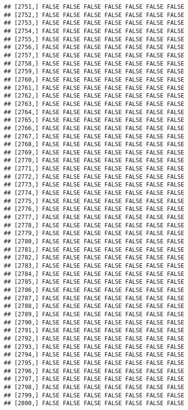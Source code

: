 \documentclass[
]{article}
\begin{document}
\begin{verbatim}
## [2751,] FALSE FALSE FALSE FALSE FALSE FALSE FALSE
## [2752,] FALSE FALSE FALSE FALSE FALSE FALSE FALSE
## [2753,] FALSE FALSE FALSE FALSE FALSE FALSE FALSE
## [2754,] FALSE FALSE FALSE FALSE FALSE FALSE FALSE
## [2755,] FALSE FALSE FALSE FALSE FALSE FALSE FALSE
## [2756,] FALSE FALSE FALSE FALSE FALSE FALSE FALSE
## [2757,] FALSE FALSE FALSE FALSE FALSE FALSE FALSE
## [2758,] FALSE FALSE FALSE FALSE FALSE FALSE FALSE
## [2759,] FALSE FALSE FALSE FALSE FALSE FALSE FALSE
## [2760,] FALSE FALSE FALSE FALSE FALSE FALSE FALSE
## [2761,] FALSE FALSE FALSE FALSE FALSE FALSE FALSE
## [2762,] FALSE FALSE FALSE FALSE FALSE FALSE FALSE
## [2763,] FALSE FALSE FALSE FALSE FALSE FALSE FALSE
## [2764,] FALSE FALSE FALSE FALSE FALSE FALSE FALSE
## [2765,] FALSE FALSE FALSE FALSE FALSE FALSE FALSE
## [2766,] FALSE FALSE FALSE FALSE FALSE FALSE FALSE
## [2767,] FALSE FALSE FALSE FALSE FALSE FALSE FALSE
## [2768,] FALSE FALSE FALSE FALSE FALSE FALSE FALSE
## [2769,] FALSE FALSE FALSE FALSE FALSE FALSE FALSE
## [2770,] FALSE FALSE FALSE FALSE FALSE FALSE FALSE
## [2771,] FALSE FALSE FALSE FALSE FALSE FALSE FALSE
## [2772,] FALSE FALSE FALSE FALSE FALSE FALSE FALSE
## [2773,] FALSE FALSE FALSE FALSE FALSE FALSE FALSE
## [2774,] FALSE FALSE FALSE FALSE FALSE FALSE FALSE
## [2775,] FALSE FALSE FALSE FALSE FALSE FALSE FALSE
## [2776,] FALSE FALSE FALSE FALSE FALSE FALSE FALSE
## [2777,] FALSE FALSE FALSE FALSE FALSE FALSE FALSE
## [2778,] FALSE FALSE FALSE FALSE FALSE FALSE FALSE
## [2779,] FALSE FALSE FALSE FALSE FALSE FALSE FALSE
## [2780,] FALSE FALSE FALSE FALSE FALSE FALSE FALSE
## [2781,] FALSE FALSE FALSE FALSE FALSE FALSE FALSE
## [2782,] FALSE FALSE FALSE FALSE FALSE FALSE FALSE
## [2783,] FALSE FALSE FALSE FALSE FALSE FALSE FALSE
## [2784,] FALSE FALSE FALSE FALSE FALSE FALSE FALSE
## [2785,] FALSE FALSE FALSE FALSE FALSE FALSE FALSE
## [2786,] FALSE FALSE FALSE FALSE FALSE FALSE FALSE
## [2787,] FALSE FALSE FALSE FALSE FALSE FALSE FALSE
## [2788,] FALSE FALSE FALSE FALSE FALSE FALSE FALSE
## [2789,] FALSE FALSE FALSE FALSE FALSE FALSE FALSE
## [2790,] FALSE FALSE FALSE FALSE FALSE FALSE FALSE
## [2791,] FALSE FALSE FALSE FALSE FALSE FALSE FALSE
## [2792,] FALSE FALSE FALSE FALSE FALSE FALSE FALSE
## [2793,] FALSE FALSE FALSE FALSE FALSE FALSE FALSE
## [2794,] FALSE FALSE FALSE FALSE FALSE FALSE FALSE
## [2795,] FALSE FALSE FALSE FALSE FALSE FALSE FALSE
## [2796,] FALSE FALSE FALSE FALSE FALSE FALSE FALSE
## [2797,] FALSE FALSE FALSE FALSE FALSE FALSE FALSE
## [2798,] FALSE FALSE FALSE FALSE FALSE FALSE FALSE
## [2799,] FALSE FALSE FALSE FALSE FALSE FALSE FALSE
## [2800,] FALSE FALSE FALSE FALSE FALSE FALSE FALSE

\end{verbatim}
\end{document}
